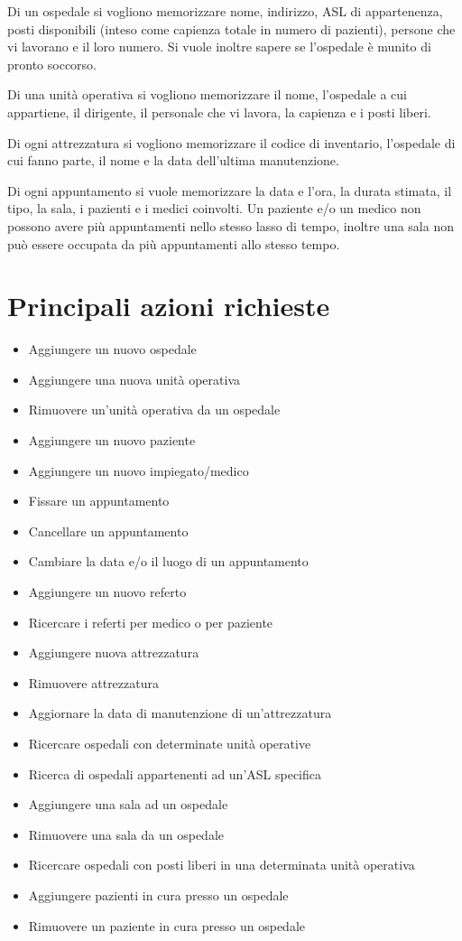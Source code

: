 \documentclass[a4paper,12pt]{report}
\begin{document}
Di un ospedale si vogliono memorizzare nome, indirizzo, ASL di appartenenza, posti disponibili (inteso come capienza totale in numero di pazienti),
persone che vi lavorano e il loro numero. Si vuole inoltre sapere se l'ospedale è munito di pronto soccorso.

Di una unità operativa si vogliono memorizzare il nome, l'ospedale a cui appartiene, il dirigente, il personale che vi lavora, la capienza e i posti liberi.

Di ogni attrezzatura si vogliono memorizzare il codice di inventario, l'ospedale di cui fanno parte, il nome e la data dell'ultima manutenzione.

Di ogni appuntamento si vuole memorizzare la data e l'ora, la durata stimata, il tipo, la sala, i pazienti e i medici coinvolti. 
Un paziente e/o un medico non possono avere più appuntamenti nello stesso lasso di tempo, inoltre una sala non può essere occupata da più 
appuntamenti allo stesso tempo.
\section{Principali azioni richieste}
\begin{itemize}
  \item Aggiungere un nuovo ospedale
  \item Aggiungere una nuova unità operativa
  \item Rimuovere un'unità operativa da un ospedale
  \item Aggiungere un nuovo paziente
  \item Aggiungere un nuovo impiegato/medico
  \item Fissare un appuntamento
  \item Cancellare un appuntamento
  \item Cambiare la data e/o il luogo di un appuntamento
  \item Aggiungere un nuovo referto
  \item Ricercare i referti per medico o per paziente
  \item Aggiungere nuova attrezzatura
  \item Rimuovere attrezzatura
  \item Aggiornare la data di manutenzione di un'attrezzatura
  \item Ricercare ospedali con determinate unità operative
  \item Ricerca di ospedali appartenenti ad un'ASL specifica
  \item Aggiungere una sala ad un ospedale
  \item Rimuovere una sala da un ospedale
  \item Ricercare ospedali con posti liberi in una determinata unità operativa
  \item Aggiungere pazienti in cura presso un ospedale
  \item Rimuovere un paziente in cura presso un ospedale
\end{itemize}
\end{document}
